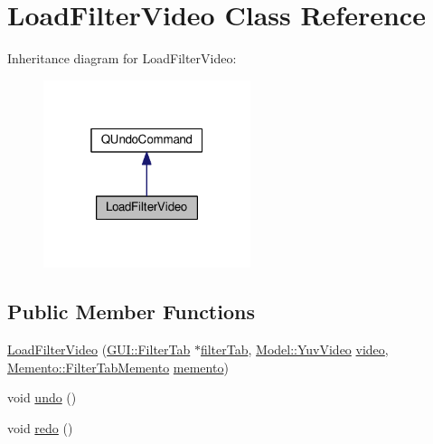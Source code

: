 \hypertarget{classUndoRedo_1_1LoadFilterVideo}{}\section{Load\+Filter\+Video Class Reference}
\label{classUndoRedo_1_1LoadFilterVideo}


Inheritance diagram for Load\+Filter\+Video\+:
\nopagebreak
\begin{figure}[H]
\begin{center}
\leavevmode
\includegraphics[width=172pt]{classUndoRedo_1_1LoadFilterVideo__inherit__graph}
\end{center}
\end{figure}
\subsection*{Public Member Functions}
\begin{DoxyCompactItemize}
\item 
\hyperlink{classUndoRedo_1_1LoadFilterVideo_a0f1e769b2aae8de0c0872a5167e6efa2}{Load\+Filter\+Video} (\hyperlink{classGUI_1_1FilterTab}{G\+U\+I\+::\+Filter\+Tab} $\ast$\hyperlink{classUndoRedo_1_1LoadFilterVideo_a47ca82534a740774d79998759818d9f4}{filter\+Tab}, \hyperlink{classModel_1_1YuvVideo}{Model\+::\+Yuv\+Video} \hyperlink{classUndoRedo_1_1LoadFilterVideo_a17d20420106e047a53677d26c8db0d48}{video}, \hyperlink{classMemento_1_1FilterTabMemento}{Memento\+::\+Filter\+Tab\+Memento} \hyperlink{classUndoRedo_1_1LoadFilterVideo_aa8d1e75f65ee5aab4748bf9907b9be58}{memento})
\item 
void \hyperlink{classUndoRedo_1_1LoadFilterVideo_a0e1e7804a53f6d62efc72c9bdbec8571}{undo} ()
\item 
void \hyperlink{classUndoRedo_1_1LoadFilterVideo_a93c48d6ed036e1a381be53ac67643284}{redo} ()
\end{DoxyCompactItemize}
